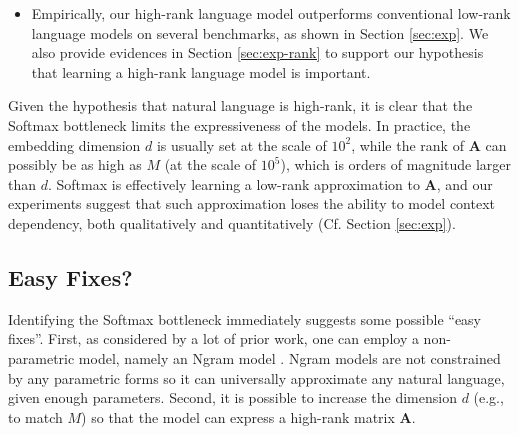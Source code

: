 \begin{itemize}[leftmargin=1.5em,label=$\bullet$]
\item Empirically, our high-rank language model outperforms conventional low-rank language models on several benchmarks, as shown in Section \ref{sec:exp}. We also provide evidences in Section \ref{sec:exp-rank} to support our hypothesis that learning a high-rank language model is important.
\end{itemize}

Given the hypothesis that natural language is high-rank, it is clear that the Softmax bottleneck limits the expressiveness of the models. In practice, the embedding dimension $d$ is usually set at the scale of $10^2$, while the rank of $\mathbf{A}$ can possibly be as high as $M$ (at the scale of $10^5$), which is orders of magnitude larger than $d$. Softmax is effectively learning a low-rank approximation to $\mathbf{A}$, and our experiments suggest that such approximation loses the ability to model context dependency, both qualitatively and quantitatively (Cf. Section \ref{sec:exp}).

\subsection{Easy Fixes?} \label{sec:fixes}
Identifying the Softmax bottleneck immediately suggests some possible ``easy fixes''.
First, as considered by a lot of prior work, one can employ a non-parametric model, namely an Ngram model \citep{kneser1995improved}. Ngram models are not constrained by any parametric forms so it can universally approximate any natural language, given enough parameters.
Second, it is possible to increase the dimension $d$ (e.g., to match $M$) so that the model can express a high-rank matrix $\mathbf{A}$.

